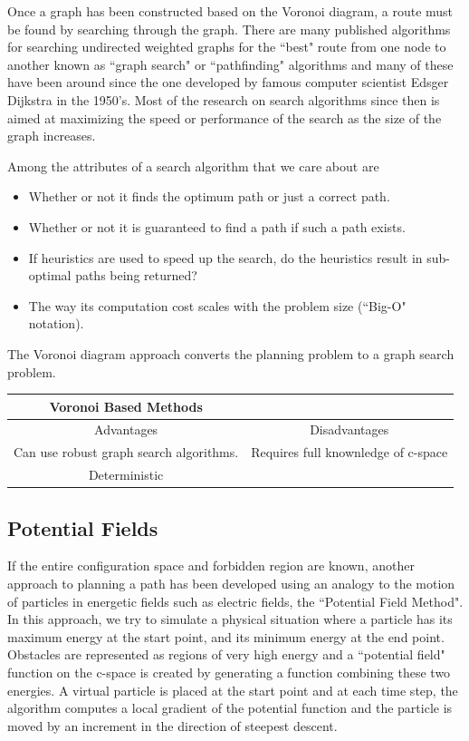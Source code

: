 Once a graph has been constructed based on the Voronoi diagram, a route must be found by searching through the graph.  There are many published algorithms for searching undirected weighted graphs for the ``best" route from one node to another known as ``graph search" or ``pathfinding" algorithms and many of these have been around since the one developed by famous computer scientist Edsger Dijkstra in the 1950's.   Most of the research on search  algorithms since then is aimed at maximizing the speed or performance of the search as the size of the graph increases. 

Among the attributes of a search algorithm that we care about are
\begin{itemize}
  \item Whether or not it finds the optimum path or just a correct path. 
  \item Whether or not it is guaranteed to find a path if such a path exists.
  \item If heuristics are used to speed up the search, do the heuristics result in sub-optimal paths being returned?
  \item The way its computation cost scales with the problem size (``Big-O" notation).
\end{itemize}

The Voronoi diagram approach converts the planning problem to a graph search problem.

\vspace{0.2in}
\begin{tabular}{|c|c|} \hline
Voronoi Based  Methods & \\ \hline \hline
Advantages		                   &   Disadvantages          			\\ \hline
 Can use robust graph search algorithms.   &   Requires full knownledge of c-space     	\\ \hline
 Deterministic				   &                                            \\ \hline
\end{tabular}


\subsection{Potential Fields}

If the entire configuration space and forbidden region are known, another approach to planning a path has been developed using an analogy to the motion of particles in energetic fields such as electric fields, the ``Potential Field Method".   In this approach, we try to simulate a physical situation where a particle has its maximum energy at the start point, and its minimum energy at the end point.  Obstacles are represented as regions of very high energy and a ``potential field" function on the c-space is created by generating a function combining these two energies.  A virtual particle is placed at the start point and at each time step, the algorithm computes a local gradient of the potential function and the particle is moved by an increment in the direction of steepest descent.  

